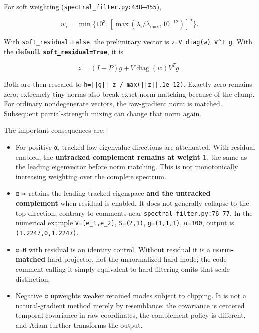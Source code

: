 \documentclass[
  british,
  10pt,
  a4paper,
]{article}
\providecommand{\tightlist}{%
  \setlength{\itemsep}{0pt}\setlength{\parskip}{0pt}}
\begin{document}
For soft weighting
(\texttt{spectral\_\allowbreak{}filter.\allowbreak{}py:\allowbreak{}438–455}),

\[
w_i=\min\{10^3,[\max(\lambda_i/\lambda_{\max},10^{-12})]^\alpha\}.
\]

With \texttt{soft\_\allowbreak{}residual=\allowbreak{}False}, the
preliminary vector is
\texttt{z=\allowbreak{}V \allowbreak{}diag(w) \allowbreak{}V\textasciicircum{}T \allowbreak{}g}.
With the \textbf{default
\texttt{soft\_\allowbreak{}residual=\allowbreak{}True}}, it is

\[
z=(I-P)g+V\operatorname{diag}(w)V^Tg.
\]

Both are then rescaled to
\texttt{h=\allowbreak{}||g|| \allowbreak{}z \allowbreak{}/\allowbreak{} \allowbreak{}max(||z||,\allowbreak{}1e−12)}.
Exactly zero remains zero; extremely tiny norms also break exact norm
matching because of the clamp. For ordinary nondegenerate vectors, the
raw-\allowbreak{}gradient norm is matched. Subsequent
partial-\allowbreak{}strength mixing can change that norm again.

The important consequences are:

\begin{itemize}
\tightlist
\item
  For positive \texttt{α}, tracked low-\allowbreak{}eigenvalue
  directions are attenuated.\allowbreak{} With residual enabled, the
  \textbf{untracked complement remains at weight 1}, the same as the
  leading eigenvector before norm matching. This is not monotonically
  increasing weighting over the complete spectrum.
\item
  \texttt{α→∞} retains the leading tracked eigenspace \textbf{and the
  untracked complement} when residual is enabled. It does not generally
  collapse to the top direction, contrary to comments near
  \texttt{spectral\_\allowbreak{}filter.\allowbreak{}py:\allowbreak{}76–77}.
  In the numerical example
  \texttt{V=\allowbreak{}[e\_\allowbreak{}1,\allowbreak{}e\_\allowbreak{}2]},
  \texttt{S=(2,1)}, \texttt{g=(1,1,1)}, \texttt{α=100}, output is
  \texttt{(1.\allowbreak{}2247,\allowbreak{}0,\allowbreak{}1.\allowbreak{}2247)}.
\item
  \texttt{α=0} with residual is an identity control. Without residual it
  is a \textbf{norm-\allowbreak{}matched} hard projector, not the
  unnormalized hard mode; the code comment calling it simply equivalent
  to hard filtering omits that scale distinction.\allowbreak{}
\item
  Negative \texttt{α} upweights weaker retained modes subject to
  clipping. It is not a natural-\allowbreak{}gradient method merely by
  resemblance: the covariance is centered temporal covariance in raw
  coordinates,\allowbreak{} the complement policy is different, and Adam
  further transforms the output.
\end{itemize}
\end{document}
